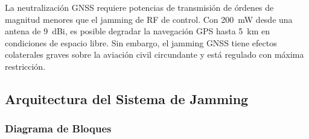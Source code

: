 \documentclass[12pt,a4paper]{article}
\begin{document}
\begin{destacado}
  La neutralización GNSS requiere potencias de transmisión de órdenes de
  magnitud menores que el jamming de RF de control.
  Con \SI{200}{mW} desde una antena de \SI{9}{dBi}, es posible degradar
  la navegación GPS hasta \SI{5}{km} en condiciones de espacio libre.
  Sin embargo, el jamming GNSS tiene efectos colaterales graves sobre
  la aviación civil circundante y está regulado con máxima restricción.
\end{destacado}

\subsection{Arquitectura del Sistema de Jamming}

\subsubsection{Diagrama de Bloques}
\end{document}
